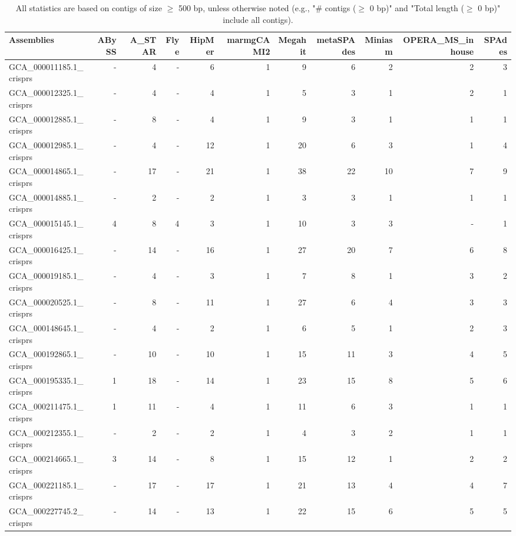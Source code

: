 \documentclass[12pt,a4paper]{article}
\begin{document}
\begin{table}[ht]
\begin{center}
\caption{All statistics are based on contigs of size $\geq$ 500 bp, unless otherwise noted (e.g., "\# contigs ($\geq$ 0 bp)" and "Total length ($\geq$ 0 bp)" include all contigs).}
\begin{tabular}{|l*{10}{|r}|}
\hline
Assemblies & ABySS & A\_STAR & Flye & HipMer & marmgCAMI2 & Megahit & metaSPAdes & Miniasm & OPERA\_MS\_inhouse & SPAdes \\ \hline
GCA\_000011185.1\_crisprs & - & 4 & - & 6 & 1 & 9 & 6 & 2 & 2 & 3 \\ \hline
GCA\_000012325.1\_crisprs & - & 4 & - & 4 & 1 & 5 & 3 & 1 & 2 & 1 \\ \hline
GCA\_000012885.1\_crisprs & - & 8 & - & 4 & 1 & 9 & 3 & 1 & 1 & 1 \\ \hline
GCA\_000012985.1\_crisprs & - & 4 & - & 12 & 1 & 20 & 6 & 3 & 1 & 4 \\ \hline
GCA\_000014865.1\_crisprs & - & 17 & - & 21 & 1 & 38 & 22 & 10 & 7 & 9 \\ \hline
GCA\_000014885.1\_crisprs & - & 2 & - & 2 & 1 & 3 & 3 & 1 & 1 & 1 \\ \hline
GCA\_000015145.1\_crisprs & 4 & 8 & 4 & 3 & 1 & 10 & 3 & 3 & - & 1 \\ \hline
GCA\_000016425.1\_crisprs & - & 14 & - & 16 & 1 & 27 & 20 & 7 & 6 & 8 \\ \hline
GCA\_000019185.1\_crisprs & - & 4 & - & 3 & 1 & 7 & 8 & 1 & 3 & 2 \\ \hline
GCA\_000020525.1\_crisprs & - & 8 & - & 11 & 1 & 27 & 6 & 4 & 3 & 3 \\ \hline
GCA\_000148645.1\_crisprs & - & 4 & - & 2 & 1 & 6 & 5 & 1 & 2 & 3 \\ \hline
GCA\_000192865.1\_crisprs & - & 10 & - & 10 & 1 & 15 & 11 & 3 & 4 & 5 \\ \hline
GCA\_000195335.1\_crisprs & 1 & 18 & - & 14 & 1 & 23 & 15 & 8 & 5 & 6 \\ \hline
GCA\_000211475.1\_crisprs & 1 & 11 & - & 4 & 1 & 11 & 6 & 3 & 1 & 1 \\ \hline
GCA\_000212355.1\_crisprs & - & 2 & - & 2 & 1 & 4 & 3 & 2 & 1 & 1 \\ \hline
GCA\_000214665.1\_crisprs & 3 & 14 & - & 8 & 1 & 15 & 12 & 1 & 2 & 2 \\ \hline
GCA\_000221185.1\_crisprs & - & 17 & - & 17 & 1 & 21 & 13 & 4 & 4 & 7 \\ \hline
GCA\_000227745.2\_crisprs & - & 14 & - & 13 & 1 & 22 & 15 & 6 & 5 & 5 \\ \hline

\end{tabular}
\end{center}
\end{table}
\end{document}

